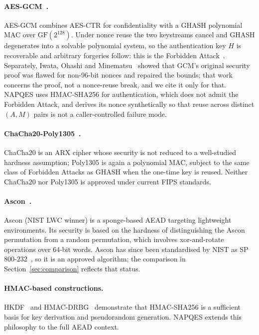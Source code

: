 \documentclass[11pt,a4paper]{article}
\begin{document}
\paragraph{AES-GCM~\cite{nist-gcm}.}
AES-GCM combines AES-CTR for confidentiality with a GHASH polynomial MAC
over $\mathrm{GF}(2^{128})$. Under nonce reuse the two keystreams cancel
and GHASH degenerates into a solvable polynomial system, so the
authentication key $H$ is recoverable and arbitrary forgeries follow: this
is the Forbidden Attack~\cite{joux2006}. Separately, Iwata, Ohashi and
Minematsu~\cite{iwata2012} showed that GCM's original security proof was
flawed for non-96-bit nonces and repaired the bounds; that work concerns
the proof, not a nonce-reuse break, and we cite it only for that. NAPQES
uses HMAC-SHA256 for authentication, which does not admit the Forbidden
Attack, and derives its nonce synthetically so that reuse across distinct
$(A,M)$ pairs is not a caller-controlled failure mode.

\paragraph{ChaCha20-Poly1305~\cite{rfc8439}.}
ChaCha20 is an ARX cipher whose security is not reduced to a well-studied
hardness assumption; Poly1305 is again a polynomial MAC, subject to the
same class of Forbidden Attacks as GHASH when the one-time key is reused.
Neither ChaCha20 nor Poly1305 is approved under current FIPS standards.

\paragraph{Ascon~\cite{ascon2021}.}
Ascon (NIST LWC winner) is a sponge-based AEAD targeting lightweight
environments. Its security is based on the hardness of distinguishing the
Ascon permutation from a random permutation, which involves xor-and-rotate
operations over 64-bit words. Ascon has since been standardised by NIST as
SP 800-232~\cite{sp800-232}, so it is an approved algorithm; the
comparison in Section~\ref{sec:comparison} reflects that status.

\paragraph{HMAC-based constructions.}
HKDF~\cite{rfc5869} and HMAC-DRBG~\cite{nist-drbg} demonstrate that
HMAC-SHA256 is a sufficient basis for key derivation and pseudorandom
generation. NAPQES extends this philosophy to the full AEAD context.
\end{document}
